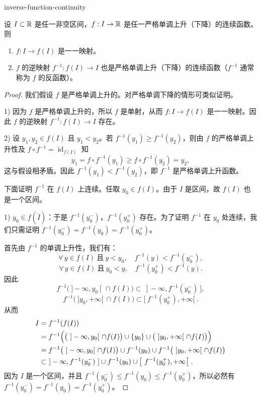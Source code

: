 \begin{mythm}{}{inverse-function-continuity}

	设 \(I\subset\mathbb{R}\) 是任一非空区间，\(f:I\to\mathbb{R}\) 是任一严格单调上升（下降）的连续函数。则

	\begin{enumerate}[label=\arabic*)]
		\item \(f:I\to f(I)\) 是一一映射。

		\item \(f\) 的逆映射 \(f^{-1}:f(I)\to I\) 也是严格单调上升（下降）的连续函数（\(f^{-1}\) 通常称为 \(f\) 的反函数）。
	\end{enumerate}

\end{mythm}

\begin{proof}

	我们假设 \(f\) 是严格单调上升的。对严格单调下降的情形可类似证明。

	1) 因为 \(f\) 是严格单调上升的，所以 \(f\) 是单射，从而 \(f:I\to f(I)\) 是一一映射。因此 \(f\) 的逆映射 \(f^{-1}:f(I)\to I\) 存在。

	2) 设 \(y_1,y_2\in f(I)\) 且 \(y_1<y_2\)。若 \(f^{-1}(y_1)\ge f^{-1}(y_2)\)，则由 \(f\) 的严格单调上升性及 \(f\circ f^{-1}=\operatorname{id}_{f(I)}\) 知
	\[
	y_1=f\circ f^{-1}(y_1)\ge f\circ f^{-1}(y_2)=y_2,
	\]
	这与假设相矛盾。因此 \(f^{-1}(y_1)<f^{-1}(y_2)\)，即 \(f^{-1}\) 是严格单调上升函数。

	下面证明 \(f^{-1}\) 在 \(f(I)\) 上连续。任取 \(y_0\in f(I)\)。由于 \(I\) 是区间，故 \(f(I)\) 也是一个区间。

	1) \(y_0\in f(\mathring I)\)：于是 \(f^{-1}(y_0^-)\)，\(f^{-1}(y_0^+)\) 存在。为了证明 \(f^{-1}\) 在 \(y_0\) 处连续，我们只需证明 \(f^{-1}(y_0^-)=f^{-1}(y_0)=f^{-1}(y_0^+)\)。

	首先由 \(f^{-1}\) 的单调上升性，我们有：
	\[
	\forall\,y\in f(I)\ \text{且}\ y<y_0,\quad f^{-1}(y)<f^{-1}(y_0^-),
	\]
	\[
	\forall\,y\in f(I)\ \text{且}\ y_0<y,\quad f^{-1}(y_0^+)<f^{-1}(y).
	\]
	因此
	\[
	f^{-1}\bigl(\ ]-\infty,y_0[\ \cap f(I)\bigr)\subset\ ]-\infty,f^{-1}(y_0^-)\ ],
	\]
	\[
	f^{-1}\bigl(\ ]y_0,+\infty[\ \cap f(I)\bigr)\subset\bigl[\ f^{-1}(y_0^+),+\infty\bigr[\ .
	\]
	从而
	\[
	\begin{aligned}
	I&=f^{-1}(f(I))\\
	&=f^{-1}\Bigl(\bigl(\ ]-\infty,y_0[\ \cap f(I)\bigr)\cup\{y_0\}\cup\bigl(\ ]y_0,+\infty[\ \cap f(I)\bigr)\Bigr)\\
	&=f^{-1}\bigl(\ ]-\infty,y_0[\ \cap f(I)\bigr)\cup f^{-1}(y_0)\cup f^{-1}\bigl(\ ]y_0,+\infty[\ \cap f(I)\bigr)\\
	&\subset\ ]-\infty,f^{-1}(y_0^-)\ ]\cup f^{-1}(y_0)\cup\bigl[\ f^{-1}(y_0^+),+\infty\bigr[\ .
	\end{aligned}
	\]
	因为 \(I\) 是一个区间，并且 \(f^{-1}(y_0^-)\le f^{-1}(y_0)\le f^{-1}(y_0^+)\)，所以必然有 \(f^{-1}(y_0^-)=f^{-1}(y_0)=f^{-1}(y_0^+)\)。


\end{proof}
